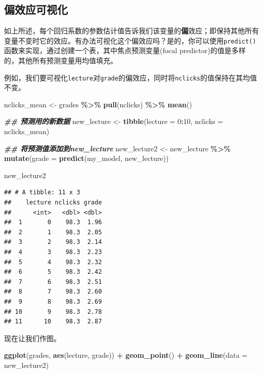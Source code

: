 \documentclass[
]{book}
\newenvironment{Shaded}{\begin{snugshade}}{\end{snugshade}}
\newcommand{\AttributeTok}[1]{\textcolor[rgb]{0.13,0.29,0.53}{#1}}
\newcommand{\DecValTok}[1]{\textcolor[rgb]{0.00,0.00,0.81}{#1}}
\newcommand{\DocumentationTok}[1]{\textcolor[rgb]{0.56,0.35,0.01}{\textbf{\textit{#1}}}}
\newcommand{\FunctionTok}[1]{\textcolor[rgb]{0.13,0.29,0.53}{\textbf{#1}}}
\newcommand{\NormalTok}[1]{#1}
\newcommand{\OtherTok}[1]{\textcolor[rgb]{0.56,0.35,0.01}{#1}}
\newcommand{\SpecialCharTok}[1]{\textcolor[rgb]{0.81,0.36,0.00}{\textbf{#1}}}
\begin{document}
\hypertarget{ux504fux6548ux5e94ux53efux89c6ux5316}{%
\subsection{偏效应可视化}\label{ux504fux6548ux5e94ux53efux89c6ux5316}}

如上所述，每个回归系数的参数估计值告诉我们该变量的\textbf{偏}效应；即保持其他所有变量不变时它的效应。有办法可视化这个偏效应吗？是的，你可以使用\texttt{predict()}函数来实现，通过创建一个表，其中焦点预测变量(focal predictor)的值是多样的，其他所有预测变量用均值填充。

例如，我们要可视化\texttt{lecture}对\texttt{grade}的偏效应，同时将\texttt{nclicks}的值保持在其均值不变。

\begin{Shaded}
\begin{Highlighting}[]
\NormalTok{nclicks\_mean }\OtherTok{\textless{}{-}}\NormalTok{ grades }\SpecialCharTok{\%\textgreater{}\%} \FunctionTok{pull}\NormalTok{(nclicks) }\SpecialCharTok{\%\textgreater{}\%} \FunctionTok{mean}\NormalTok{()}

\DocumentationTok{\#\# 预测用的新数据}
\NormalTok{new\_lecture }\OtherTok{\textless{}{-}} \FunctionTok{tibble}\NormalTok{(}\AttributeTok{lecture =} \DecValTok{0}\SpecialCharTok{:}\DecValTok{10}\NormalTok{,}
                      \AttributeTok{nclicks =}\NormalTok{ nclicks\_mean)}

\DocumentationTok{\#\# 将预测值添加到new\_lecture}
\NormalTok{new\_lecture2 }\OtherTok{\textless{}{-}}\NormalTok{ new\_lecture }\SpecialCharTok{\%\textgreater{}\%}
  \FunctionTok{mutate}\NormalTok{(}\AttributeTok{grade =} \FunctionTok{predict}\NormalTok{(my\_model, new\_lecture))}

\NormalTok{new\_lecture2}
\end{Highlighting}
\end{Shaded}

\begin{verbatim}
## # A tibble: 11 x 3
##    lecture nclicks grade
##      <int>   <dbl> <dbl>
##  1       0    98.3  1.96
##  2       1    98.3  2.05
##  3       2    98.3  2.14
##  4       3    98.3  2.23
##  5       4    98.3  2.32
##  6       5    98.3  2.42
##  7       6    98.3  2.51
##  8       7    98.3  2.60
##  9       8    98.3  2.69
## 10       9    98.3  2.78
## 11      10    98.3  2.87
\end{verbatim}

现在让我们作图。

\begin{Shaded}
\begin{Highlighting}[]
\FunctionTok{ggplot}\NormalTok{(grades, }\FunctionTok{aes}\NormalTok{(lecture, grade)) }\SpecialCharTok{+} 
  \FunctionTok{geom\_point}\NormalTok{() }\SpecialCharTok{+}
  \FunctionTok{geom\_line}\NormalTok{(}\AttributeTok{data =}\NormalTok{ new\_lecture2)}
\end{Highlighting}
\end{Shaded}
\end{document}
